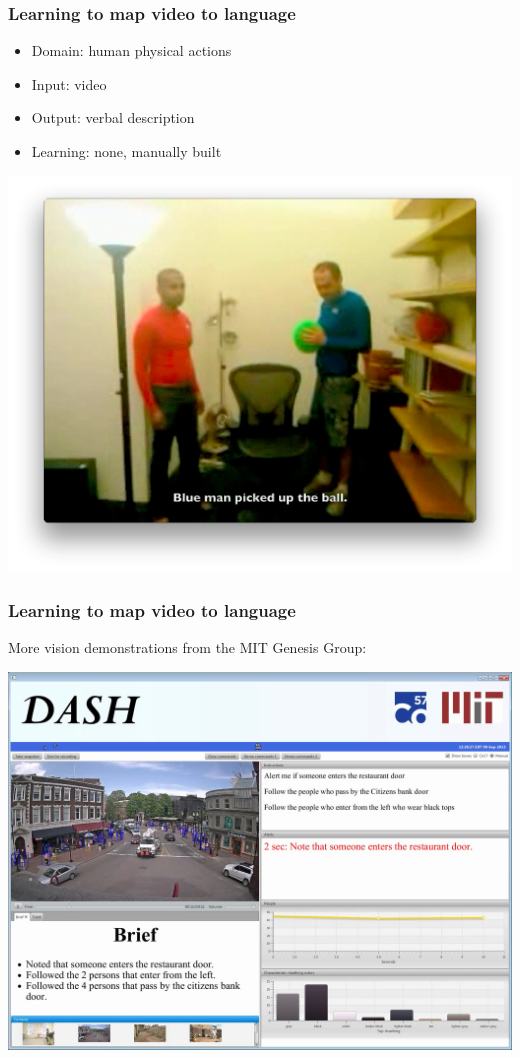 \documentclass[ignorenonframetext]{beamer}
\begin{document}
\begin{frame}\frametitle{Learning to map video to language}
\begin{itemize}
\item Domain: human physical actions
\item Input: video
\item Output: verbal description
\item Learning: none, manually built
\end{itemize}

\begin{center}
\href{http://groups.csail.mit.edu/genesis/movies/redandbluemen.mp4}{
\includegraphics[height=.7\textheight]{images/redandbluemen.png}}
\end{center}
\end{frame}

\begin{frame}\frametitle{Learning to map video to language}
\begin{center}
More vision demonstrations from the MIT Genesis Group:
\vspace{1em}

\href{http://groups.csail.mit.edu/genesis/visiondemonstrations}{
\includegraphics[height=.7\textheight]{images/genesis-vision.png}}
\end{center}
\end{frame}
\end{document}
